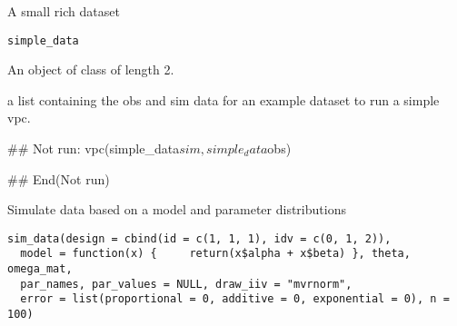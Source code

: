\documentclass[letterpaper]{book}
\begin{document}
%
\begin{Description}\relax
A small rich dataset
\end{Description}
%
\begin{Usage}
\begin{verbatim}
simple_data
\end{verbatim}
\end{Usage}
%
\begin{Format}
An object of class  of length 2.
\end{Format}
%
\begin{Details}\relax
a list containing the obs and sim data for an example dataset to run a 
simple vpc.
\end{Details}
%
\begin{Examples}
\begin{ExampleCode}
## Not run: 
vpc(simple_data$sim, simple_data$obs)

## End(Not run)
\end{ExampleCode}
\end{Examples}
%
\begin{Description}\relax
Simulate data based on a model and parameter distributions
\end{Description}
%
\begin{Usage}
\begin{verbatim}
sim_data(design = cbind(id = c(1, 1, 1), idv = c(0, 1, 2)),
  model = function(x) {     return(x$alpha + x$beta) }, theta, omega_mat,
  par_names, par_values = NULL, draw_iiv = "mvrnorm",
  error = list(proportional = 0, additive = 0, exponential = 0), n = 100)
\end{verbatim}
\end{Usage}
%
\end{document}
